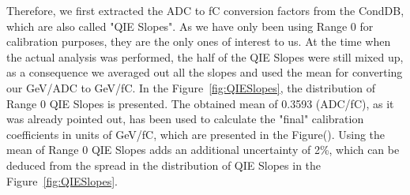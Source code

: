Therefore, we first extracted the ADC to fC conversion factors from the CondDB,
which are also called "QIE Slopes". As we have only been using Range 0 for
calibration purposes, they are the only ones of interest to us. At the time when
the actual analysis was performed, the half of the QIE Slopes were still mixed
up, as a consequence we averaged out all the slopes and used the mean for
converting our GeV/ADC to GeV/fC. In the Figure~\ref{fig:QIESlopes}, the
distribution of Range 0 QIE Slopes is presented. The obtained mean of 0.3593
(ADC/fC), as it was already pointed out, has been used to calculate the "final"
calibration coefficients in units of GeV/fC, which are presented in the
Figure().
Using the mean of Range 0 QIE Slopes adds an additional
uncertainty of 2\%, which can be deduced from the spread in the distribution of
QIE Slopes in the Figure~\ref{fig:QIESlopes}.

